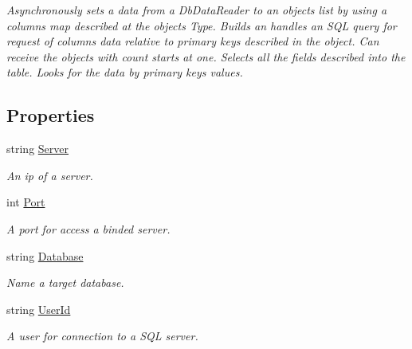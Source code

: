 \begin{DoxyCompactItemize}
\begin{DoxyCompactList}\small\item\em Asynchronously sets a data from a Db\+Data\+Reader to an objects list by using a columns map described at the object\textquotesingle{}s Type. Builds an handles an S\+QL query for request of columns data relative to primary keys described in the object. Can receive the objects with count starts at one. Selects all the fields described into the table. Looks for the data by primary keys values. \end{DoxyCompactList}\end{DoxyCompactItemize}
\subsection*{Properties}
\begin{DoxyCompactItemize}
\item 
string \mbox{\hyperlink{interface_uniform_data_operator_1_1_sql_1_1_i_sql_operator_ab1b593e38cb9377dac847811c483f2f3}{Server}}
\begin{DoxyCompactList}\small\item\em An ip of a server. \end{DoxyCompactList}\item 
int \mbox{\hyperlink{interface_uniform_data_operator_1_1_sql_1_1_i_sql_operator_a2d0ac2538fa196b181f6e0ab523db137}{Port}}
\begin{DoxyCompactList}\small\item\em A port for access a binded server. \end{DoxyCompactList}\item 
string \mbox{\hyperlink{interface_uniform_data_operator_1_1_sql_1_1_i_sql_operator_a55b7f28ed4ab20f124e67e2d447f8b40}{Database}}
\begin{DoxyCompactList}\small\item\em Name a target database. \end{DoxyCompactList}\item 
string \mbox{\hyperlink{interface_uniform_data_operator_1_1_sql_1_1_i_sql_operator_abf0c3a32c8161030b37ccf960c395d4f}{User\+Id}}
\begin{DoxyCompactList}\small\item\em A user for connection to a S\+QL server. \end{DoxyCompactList}\item 

\end{DoxyCompactItemize}
